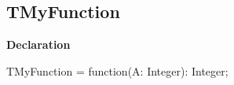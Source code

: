 \documentclass{report}
\newif\ifpdf
\begin{document}
\subsection*{TMyFunction}
\fi
\label{ok_link_function_type-TMyFunction}
\begin{list}{}{
\setlength{\itemindent}{0cm}
\setlength{\listparindent}{0cm}
\setlength{\leftmargin}{\evensidemargin}
\addtolength{\leftmargin}{\tmplength}
\settowidth{\labelsep}{X}
\addtolength{\leftmargin}{\labelsep}
\setlength{\labelwidth}{\tmplength}
}
\item[\textbf{Declaration}\hfill]
\ifpdf
\begin{flushleft}
\fi
\begin{ttfamily}
TMyFunction = function(A: Integer): Integer;\end{ttfamily}

\ifpdf
\end{flushleft}
\fi

\end{list}
\end{document}
